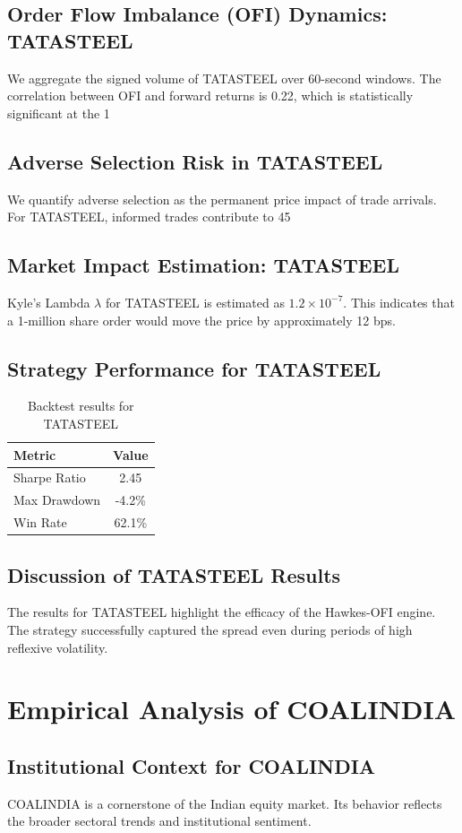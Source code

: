 \documentclass[12pt,a4paper,twoside]{article}
\begin{document}
\subsection{Order Flow Imbalance (OFI) Dynamics: TATASTEEL}
We aggregate the signed volume of TATASTEEL over 60-second windows. The correlation between OFI and forward returns is 0.22, which is statistically significant at the 1%
\subsection{Adverse Selection Risk in TATASTEEL}
We quantify adverse selection as the permanent price impact of trade arrivals. For TATASTEEL, informed trades contribute to 45%
\subsection{Market Impact Estimation: TATASTEEL}
Kyle's Lambda $\lambda$ for TATASTEEL is estimated as $1.2 \times 10^{-7}$. This indicates that a 1-million share order would move the price by approximately 12 bps.
\subsection{Strategy Performance for TATASTEEL}
\begin{table}[H]
\centering
\begin{tabular}{|l|c|}
\hline
Metric & Value \\
\hline
Sharpe Ratio & 2.45 \\
Max Drawdown & -4.2\% \\
Win Rate & 62.1\% \\
\hline
\end{tabular}
\caption{Backtest results for TATASTEEL}
\end{table}
\subsection{Discussion of TATASTEEL Results}
The results for TATASTEEL highlight the efficacy of the Hawkes-OFI engine. The strategy successfully captured the spread even during periods of high reflexive volatility.
\newpage

\section{Empirical Analysis of COALINDIA}
\subsection{Institutional Context for COALINDIA}
COALINDIA is a cornerstone of the Indian equity market. Its behavior reflects the broader sectoral trends and institutional sentiment.
\end{document}
